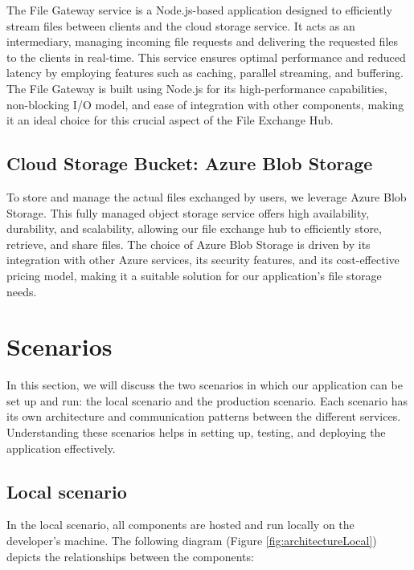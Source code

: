 \documentclass[a4paper,fleqn]{cas-dc}
\begin{document}
The File Gateway service is a Node.js-based application designed to efficiently stream files between clients and the cloud storage service. It acts as an intermediary, managing incoming file requests and delivering the requested files to the clients in real-time. This service ensures optimal performance and reduced latency by employing features such as caching, parallel streaming, and buffering. The File Gateway is built using Node.js for its high-performance capabilities, non-blocking I/O model, and ease of integration with other components, making it an ideal choice for this crucial aspect of the File Exchange Hub.

\subsection{Cloud Storage Bucket: Azure Blob Storage}

To store and manage the actual files exchanged by users, we leverage Azure Blob Storage. This fully managed object storage service offers high availability, durability, and scalability, allowing our file exchange hub to efficiently store, retrieve, and share files. The choice of Azure Blob Storage is driven by its integration with other Azure services, its security features, and its cost-effective pricing model, making it a suitable solution for our application's file storage needs.

\section{Scenarios} \label{sec:scenarios}

In this section, we will discuss the two scenarios in which our application can be set up and run: the local scenario and the production scenario. Each scenario has its own architecture and communication patterns between the different services. Understanding these scenarios helps in setting up, testing, and deploying the application effectively.

\subsection{Local scenario}

In the local scenario, all components are hosted and run locally on the developer's machine. The following diagram (Figure \ref{fig:architectureLocal}) depicts the relationships between the components:
\end{document}
